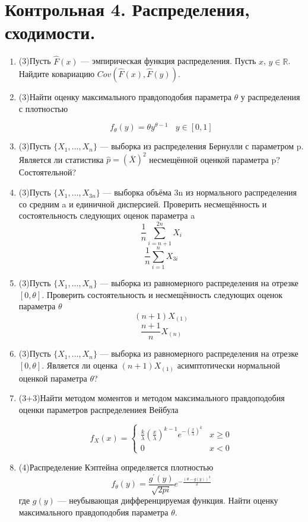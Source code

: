 \documentclass[a4paper, 14pt]{extarticle}
\begin{document}
\section*{Контрольная 4. Распределения, сходимости.} 
\begin{enumerate}

\item (3)Пусть $\hat F(x)$ --- эмпирическая функция распределения. Пусть $x$, $y \in \mathbb{R}$. Найдите ковариацию $Cov(\hat F(x), \hat F(y))$.

\item (3)Найти оценку максимального правдоподобия параметра $\theta$ у распределения с плотностью

$$f_{\theta}(y) = \theta y^{\theta - 1} ~~~~ y\in[0,1]$$

\item (3)Пусть  $\{X_1 ,\ldots , X_{n}\}$ — выборка из распределения Бернулли
с параметром p. Является ли статистика $\hat{p} = (\overline{X})^2$ несмещённой
оценкой параметра p? Состоятельной?

\item (3)Пусть $\{X_1 ,\ldots , X_{3n}\}$ — выборка объёма 3n из нормального
распределения со средним a и единичной дисперсией. Проверить
несмещённость и состоятельность следующих оценок параметра a
$$\frac{1}{n}\sum_{i=n+1}^{2n}X_i$$
$$\frac{1}{n}\sum_{i=1}^{n}X_{3i}$$

\item (3)Пусть $\{X_1 ,\ldots , X_{n}\}$ — выборка из равномерного распределения на отрезке $[0, \theta]$. Проверить состоятельность и несмещённость
следующих оценок параметра $\theta$
$$(n+1)X_{(1)}$$
$$\frac{n+1}{n}X_{(n)}$$

\item (3)Пусть $\{X_1 ,\ldots , X_{n}\}$ — выборка из равномерного распределения на отрезке $[0, \theta]$. Является ли оценка $(n+1)X_{(1)}$ 
асимптотически нормальной оценкой параметра $\theta$?

\item (3+3)Найти методом моментов и методом максимального правдоподобия оценки параметров распределениея Вейбула

$$f_{X}(x) = \begin{cases}
\frac{k}{\lambda}(\frac{x}{\lambda})^{k-1}e^{-(\frac{x}{\lambda})^{k}} & x\geq 0 \\
0 & x<0 
\end{cases}$$

\item (4)Распределение Кэптейна определяется плотностью
$$f_{\theta}(y) = \frac{g^{'}(y)}{\sqrt{2pi}}e^{-\frac{(\theta - g(y))^2}{2}}$$
где $g(y)$ — неубывающая дифференцируемая функция. 
Найти оценку максимального правдоподобия параметра $\theta$.


\end{enumerate}
\end{document}
